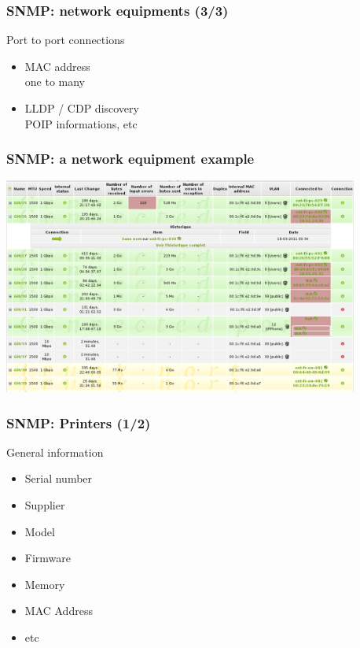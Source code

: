 \documentclass{beamer}
\begin{document}
\begin{frame}
    \frametitle{SNMP: network equipments (3/3)}

    \begin{block}{Port to port connections}
    \begin{itemize}
    \item MAC address \\ 
    \small{one to many}
    \item LLDP / CDP discovery \\
    \small{POIP informations, etc}
    \end{itemize}
    \end{block}
\end{frame}

\begin{frame}
    \frametitle{SNMP: a network equipment example}

    \begin{center}
    \includegraphics[width=11.7cm]{./pics/switch_ports.png}
    \end{center}
\end{frame}

\begin{frame}
    \frametitle{SNMP: Printers (1/2)}

    \begin{block}{General information}
    \begin{itemize}
    \item Serial number
    \item Supplier
    \item Model
    \item Firmware
    \item Memory
    \item MAC Address
    \item etc
    \end{itemize}
    \end{block}
\end{frame}
\end{document}
